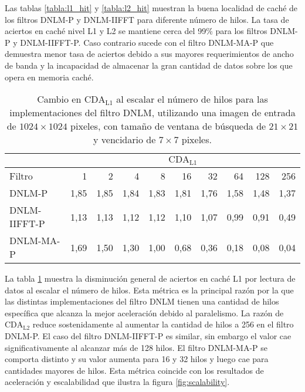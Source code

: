 Las tablas \ref{tabla:l1_hit} y \ref{tabla:l2_hit} muestran la buena localidad de cach\'e de los filtros DNLM-P y DNLM-IIFFT para diferente n\'umero de hilos. La tasa de aciertos en cach\'e nivel L1 y L2 se mantiene cerca del 99\%  para los filtros DNLM-P y DNLM-IIFFT-P. Caso contrario sucede con el filtro DNLM-MA-P que demuestra menor tasa de aciertos debido a sus mayores requerimientos de ancho de banda y la incapacidad de almacenar la gran cantidad de datos sobre los que opera en memoria cach\'e. 

\begin{table}[htb]
\centering
\caption[Cambio en la raz\'on de c\'omputo en caché L1 por acceso a datos al escalar el n\'umero de hilos]{Cambio en  $\text{CDA}_\text{L1}$ al escalar el n\'umero de hilos para las implementaciones del filtro DNLM, utilizando una imagen de entrada de $1024 \times 1024$ pixeles, con tama\~no de ventana de búsqueda de $21 \times 21$ y vencidario de $7 \times 7$ pixeles. \label{tabla:cda_l1}}
\begin{tabular}{lrrrrrrrrr}
& \multicolumn{9}{c}{$\text{CDA}_\text{L1}$} \tabularnewline
\hline
 Filtro & 1 & 2 & 4 & 8 & 16 & 32 & 64 & 128 & 256 \tabularnewline
\hline
DNLM-P & 1,85 & 1,85 & 1,84 & 1,83 & 1,81 &	1,76 & 1,58 & 1,48  & 1,37 \tabularnewline
DNLM-IIFFT-P & 1,13	& 1,13 & 1,12 & 1,12 & 1,10 & 1,07 & 0,99 & 0,91 & 0,49 \tabularnewline
DNLM-MA-P & 1,69 & 1,50 & 1,30 & 1,00 & 0,68 & 0,36 & 0,18 & 0,08 & 0,04 \tabularnewline
\end{tabular}
\end{table}

La tabla \ref{tabla:cda_l1} muestra la disminuci\'on general de aciertos en cach\'e L1 por lectura de datos al escalar el n\'umero de hilos. Esta m\'etrica es la principal raz\'on por la que las distintas implementaciones del filtro DNLM tienen una cantidad de hilos espec\'ifica que alcanza la mejor aceleraci\'on debido al paralelismo. La raz\'on de $\text{CDA}_\text{L2}$ reduce sostenidamente al aumentar la cantidad de hilos a 256 en el filtro DNLM-P. El caso del filtro DNLM-IIFFT-P es similar, sin embargo el valor cae significativamente al alcanzar m\'	as de 128 hilos. El filtro DNLM-MA-P se comporta distinto y su valor aumenta para 16 y 32 hilos y luego cae para cantidades mayores de hilos. Esta m\'etrica coincide con los resultados de aceleraci\'on y escalabilidad que ilustra la figura \ref{fig:scalability}.

